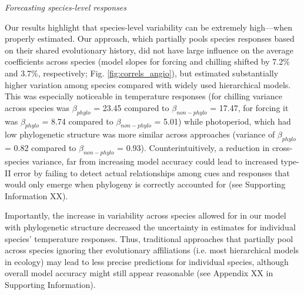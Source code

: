 \documentclass{article}\usepackage[]{graphicx}\usepackage[]{color}
\begin{document}

\emph{Forecasting species-level responses}

Our results highlight that species-level variability can be extremely high---when properly estimated. Our approach, which partially pools species responses based on their shared evolutionary history, did not have large influence on the average coefficients across species (model slopes for forcing and chilling shifted by 7.2\% and 3.7\%, respectively; Fig. \ref{fig:correls_angio}), but estimated substantially higher variation among species compared with widely used hierarchical models. This was especially noticeable in temperature responses (for chilling variance across species was $\beta_{phylo}$ = 23.45 compared to $\beta_{non-phylo}$ = 17.47, for forcing it was $\beta_{phylo}$ = 8.74 compared to $\beta_{non-phylo}$ = 5.01) while photoperiod, which had low phylogenetic structure was more similar across approaches (variance of $\beta_{phylo}$ = 0.82 compared to $\beta_{non-phylo}$ = 0.93). Counterintuitively, a reduction in cross-species variance, far from increasing model accuracy could lead to increased type-II error by failing to detect actual relationships among cues and responses that would only emerge when phylogeny is correctly accounted for (see Supporting Information XX). %

Importantly, the increase in variability across species allowed for in our model with phylogenetic structure decreased the uncertainty in estimates for individual species' temperature responses. Thus, traditional approaches that partially pool across species ignoring ther evolutionary affiliations (i.e. most hierarchical models in ecology) may lead to less precise predictions for individual species, although overall model accuracy might still appear reasonable (see Appendix XX in Supporting Information).%
\end{document}
